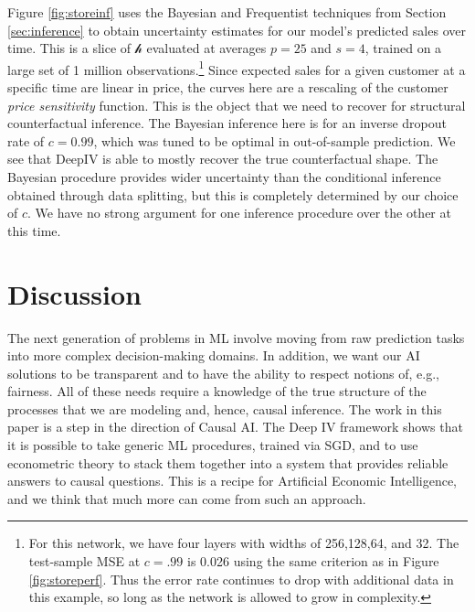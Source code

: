 \documentclass[12pt]{article}
\newcommand{\cf}{\ensuremath{\mathscr{h}}}
\newcommand{\mt}[1]{\todo[inline,color=red!50]{MT: #1}}
\begin{document}
Figure \ref{fig:storeinf} uses the Bayesian and Frequentist techniques from Section \ref{sec:inference} to obtain uncertainty estimates for our model's predicted sales over time.  This is a slice of $\cf$ evaluated at averages $p=25$ and $s=4$, trained on a large set of 1 million observations.\footnote{For this network, we have four layers with widths of 256,128,64, and 32.  The test-sample MSE at $c=.99$ is 0.026 using the same criterion as in Figure \ref{fig:storeperf}.  Thus the error rate continues to drop with additional data in this example, so long as the network is allowed to grow in complexity. } Since expected sales for a given customer at a specific time are linear in price, the curves here are a rescaling of the customer {\it price sensitivity} function.  This is the object that we need to recover for structural counterfactual inference.  The Bayesian inference here is for an inverse dropout rate of $c=0.99$, which was tuned to be optimal in out-of-sample prediction.  We see that DeepIV is able to mostly recover the true counterfactual shape.  The Bayesian procedure provides wider uncertainty than the conditional inference obtained through data splitting, but this is completely determined by our choice of $c$.   We have no strong argument for one inference  procedure over the other at this time.





\section{Discussion}
\label{sec:disc}

The next generation of problems in ML involve moving from raw prediction tasks into more complex decision-making domains.  In addition, we want our AI solutions to be transparent and to have the ability to respect notions of, e.g., fairness. All of these needs require a knowledge of the true structure of the processes that we are modeling and, hence, causal inference.  The work in this paper is a step in the direction of Causal AI.  The Deep IV framework shows that it is possible to take generic ML procedures, trained via SGD, and to use econometric theory to stack them together into a system that provides reliable answers to causal questions.  This is a recipe for Artificial Economic Intelligence, and we think that much more can come from such an approach.


\end{document}
